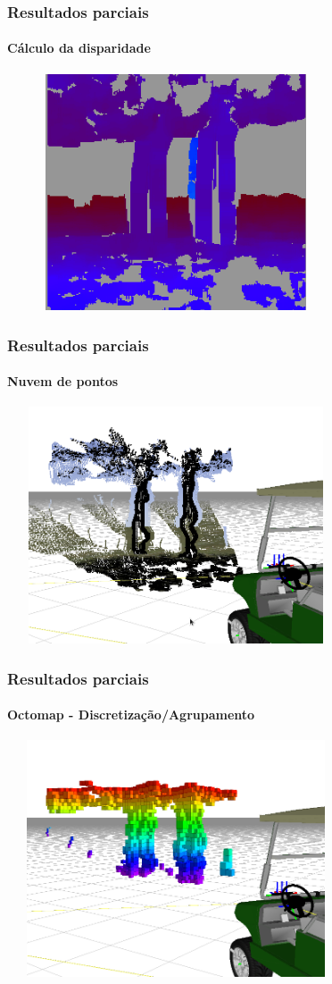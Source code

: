 \documentclass[brazil]{beamer}
\begin{document}
\begin{frame}
\frametitle{Resultados parciais}
\framesubtitle{Cálculo da disparidade}
\includegraphics[width=10cm,height=7cm,]{../img/arq_disp.png}
\end{frame}

\begin{frame}
\frametitle{Resultados parciais}
\framesubtitle{Nuvem de pontos}
\includegraphics[width=10cm,height=7cm,]{../img/arq_cloud.png}
\end{frame}

\begin{frame}
\frametitle{Resultados parciais}
\framesubtitle{Octomap - Discretização/Agrupamento}
\includegraphics[width=10cm,height=7cm,]{../img/arq_octomap.png}
\end{frame}
\end{document}
